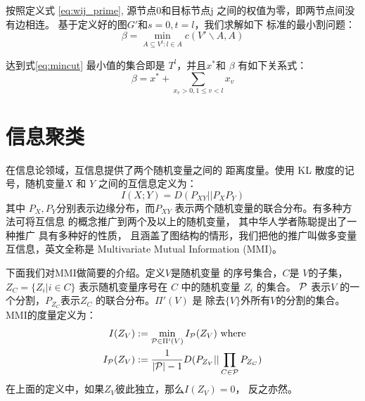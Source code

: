 按照定义式 \eqref{eq:wij_prime}, 源节点0和目标节点j
之间的权值为零，即两节点间没有边相连。
基于定义好的图$G'$和$s=0,t=l$，我们求解如下
标准的最小割问题：
\begin{equation}\label{eq:mincut}
  \beta = \min_{A \subseteq V^l: l\in A }
  c(V' \backslash A, A)
\end{equation}

达到式\eqref{eq:mincut}
最小值的集合即是 $T^l$，并且$x^*$和 $\beta$
有如下关系式：
\begin{equation}\label{eq:beta_alpha}
  \beta = x^* + \sum_{x_v > 0, 1\leq v < l} x_v
\end{equation}

\section{信息聚类}\label{sec:info_clustering}
在信息论领域，互信息提供了两个随机变量之间的
距离度量。使用 KL 散度的记号，随机变量$X$
和 $Y$ 之间的互信息定义为：
\begin{equation}\label{eq:mutual_info}
  I(X;Y) = D(P_{XY} ||P_XP_Y)
\end{equation}
其中 $P_X, P_Y$分别表示边缘分布，而$P_{XY}$
表示两个随机变量的联合分布。有多种方法可将互信息
的概念推广到两个及以上的随机变量，
其中华人学者陈聪提出了一种推广 \cite{ska} 具有多种好的性质，
且涵盖了图结构的情形，我们把他的推广叫做多变量互信息，英文全称是
Multivariate Mutual Information (MMI)。

下面我们对MMI做简要的介绍。定义$V$是随机变量
的序号集合，$C$是 $V$的子集，$Z_C=\{Z_i | i \in C\}$
表示随机变量序号在 $C$ 中的随机变量 $Z_i$ 的集合。
$\P$ 表示$V$ 的一个分割，$P_{Z_C}$表示$Z_C$
的联合分布。$\Pi'(V)$ 是
除去$\{V\}$外所有$V$的分割的集合。MMI的度量定义为：
\begin{align}
  I(Z_V) &:= \min_{\P \in \Pi'(V)} I_{\P}(Z_V) \textrm{ where } \label{eq:IZV}\\  
  I_{\P}(Z_V) &:= \frac{1}{|\P| - 1}D(P_{Z_V} || \prod_{C\in \P} P_{Z_C}) \label{eq:IPZV}
\end{align}
在上面的定义中，如果$Z_V$彼此独立，那么$I(Z_V)=0$，
反之亦然。


